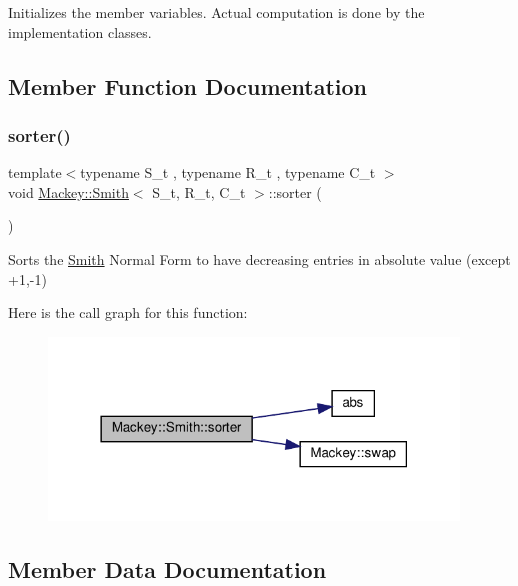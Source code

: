 Initializes the member variables. Actual computation is done by the implementation classes. 



\subsection{Member Function Documentation}
\mbox{\label{classMackey_1_1Smith_a30c76fbf9cb906c04908def480b0a321}} 
\subsubsection{\texorpdfstring{sorter()}{sorter()}}
{\footnotesize\ttfamily template$<$typename S\+\_\+t , typename R\+\_\+t , typename C\+\_\+t $>$ \\
void \hyperlink{classMackey_1_1Smith}{Mackey\+::\+Smith}$<$ S\+\_\+t, R\+\_\+t, C\+\_\+t $>$\+::sorter (\begin{DoxyParamCaption}{ }\end{DoxyParamCaption})\hspace{0.3cm}{\ttfamily [protected]}}



Sorts the \hyperlink{classMackey_1_1Smith}{Smith} Normal Form to have decreasing entries in absolute value (except +1,-\/1) 

Here is the call graph for this function\+:\nopagebreak
\begin{figure}[H]
\begin{center}
\leavevmode
\includegraphics[width=309pt]{classMackey_1_1Smith_a30c76fbf9cb906c04908def480b0a321_cgraph}
\end{center}
\end{figure}


\subsection{Member Data Documentation}
\mbox{\label{classMackey_1_1Smith_a4d7f709505152b53130018e46f9e8411}} 
